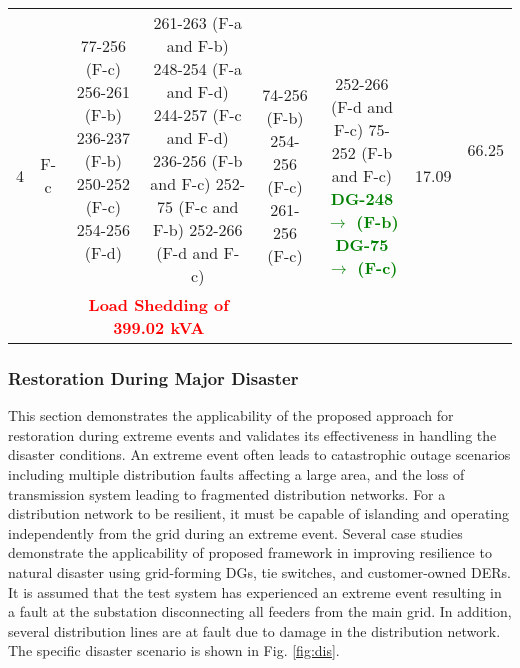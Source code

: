 \documentclass[12pt]{article}
\begin{document}
\begin{table*}[t]
\begin{tabular}{c|c|c|c|c|c|c|c}
            \hline
            \multirow{7}{*}{4} & \multirow{7}{*}{F-c} &\multirow{6}{6.1 em}{77-256 (F-c) 256-261 (F-b) 236-237 (F-b) 250-252 (F-c) 254-256 (F-d)}  &\multirow{6}{9.7 em}{261-263 (F-a and F-b) 248-254 (F-a and F-d) 244-257 (F-c and F-d) 236-256 (F-b and F-c) 252-75 (F-c and F-b) 252-266 (F-d and F-c)}&\multirow{7}{6.0 em}{74-256 (F-b) 254-256 (F-c) 261-256 (F-c) } & \multirow{7}{9.7 em}{252-266 (F-d and F-c) 75-252 (F-b and F-c)  \textcolor{green}{ \textbf{DG-248 $\rightarrow$ (F-b)}}  \textcolor{green}{ \textbf{DG-75 $\rightarrow$ (F-c)}}}&\multirow{7}{*}{17.09} &\multirow{6}{*}{66.25}\\
            &  & &  &&& &\\
            &  & &  &&& &\\
            &  & & &&& &\\
            &  & &  &&& &\\
            &  & &  &&& &\\
        \cline{3-4}
        &  & \multicolumn{2}{c|}{\textcolor{red}{\textbf{Load Shedding of 399.02 kVA}}}&&& &\\
        \hline
    \end{tabular}
\end{table*}

\subsubsection{Restoration During Major Disaster}
This section demonstrates the applicability of the proposed approach for restoration during extreme events and validates its effectiveness in handling the disaster conditions. An extreme event often leads to catastrophic outage scenarios including multiple distribution faults affecting a large area, and the loss of transmission system leading to fragmented distribution networks.
For a distribution network to be resilient, it must be capable of islanding and operating independently from the grid during an extreme event. Several case studies demonstrate the applicability of proposed framework in improving resilience to natural disaster using grid-forming DGs, tie switches, and customer-owned DERs. It is assumed that the test system has experienced an extreme event resulting in a fault at the substation disconnecting all feeders from the main grid. 
In addition, several distribution lines are at fault due to damage in the distribution network. The specific disaster scenario is shown in Fig. \ref{fig:dis}.
\end{document}

